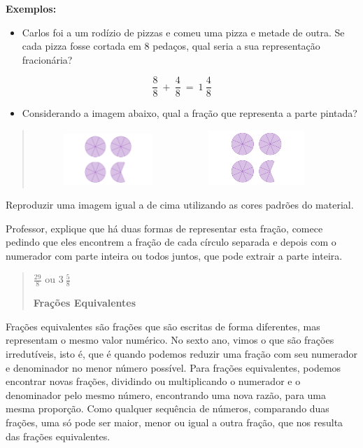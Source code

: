 {{{\textbf{Exemplos:}

\begin{itemize}
\tightlist
\item
  Carlos foi a um rodízio de pizzas e comeu uma pizza e metade de outra.
  Se cada pizza fosse cortada em 8 pedaços, qual seria a sua
  representação fracionária?
\end{itemize}

\[\frac{8}{8}\  + \ \frac{4}{8}\  = \ 1\ \frac{4}{8}\]

\begin{itemize}
\tightlist
\item
  Considerando a imagem abaixo, qual a fração que representa a parte
  pintada?
\end{itemize}

\begin{quote}
\includegraphics[width=2.22515in,height=0.76042in]{./imgSAEB_7_MAT/media/image5.png}\includegraphics[width=2.18869in,height=0.81698in]{./imgSAEB_7_MAT/media/image5.png}
\end{quote}

Reproduzir uma imagem igual a de cima utilizando as cores padrões do
material.

Professor, explique que há duas formas de representar esta fração,
comece pedindo que eles encontrem a fração de cada círculo separada e
depois com o numerador com parte inteira ou todos juntos, que pode
extrair a parte inteira.

\begin{quote}
\(\frac{29}{8}\) ou \(3\ \frac{5}{8}\)

\textbf{Frações Equivalentes}
\end{quote}

Frações equivalentes são frações que são escritas de forma diferentes,
mas representam o mesmo valor numérico. No sexto ano, vimos o que são
frações irredutíveis, isto é, que é quando podemos reduzir uma fração
com seu numerador e denominador no menor número possível. Para frações
equivalentes, podemos encontrar novas frações, dividindo ou
multiplicando o numerador e o denominador pelo mesmo número, encontrando
uma nova razão, para uma mesma proporção. Como qualquer sequência de
números, comparando duas frações, uma só pode ser maior, menor ou igual
a outra fração, que nos resulta das frações equivalentes.

}}}
